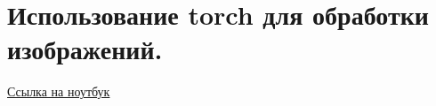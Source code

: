 \section{Использование torch для обработки изображений.}

\href{https://github.com/andriygav/School/blob/master/2018/AD/Lecture/Lecture16.ipynb}{Ссылка на ноутбук}